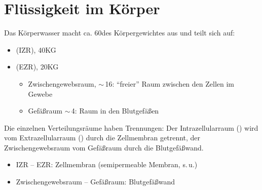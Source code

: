 \clearpage
\section{Flüssigkeit im Körper}

{%
Das Körperwasser macht ca. 60\PC* des Körpergewichtes
aus und teilt sich auf:

\begin{itemize}
  \item {} (IZR), 40\PC* KG
  \item {} (EZR), 20\PC* KG
  \begin{itemize}
    \item {}Zwischengewebsraum,
    $\sim$\,16\PC*: \enquote{freier}
    Raum zwischen den Zellen im Gewebe
    \item {}Gefäßraum $\sim$\,4\PC*:
    Raum in den Blutgefäßen
  \end{itemize}
\end{itemize}
}{}{}{}{}


{%
Die einzelnen Verteilungsräume haben Trennungen: Der
Intrazellularraum () wird vom Extrazellularraum
() durch die Zellmembran getrennt, der
Zwischengewebsraum vom Gefäßraum durch die Blutgefäßwand.
}{
\begin{itemize}
    \item IZR -- EZR:    Zellmembran (semipermeable Membran,
    s.\,u.)
    \item Zwischengewebsraum -- Gefäßraum:  Blutgefäßwand
\end{itemize}
}{}{}{}


